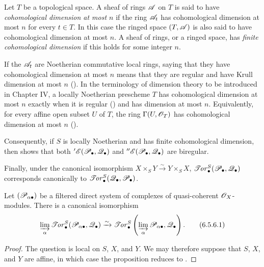\begin{env}[6.5.5]
\label{III.6.5.5}
Let $T$ be a topological space.  A sheaf of rings $\mathscr{A}$ on $T$
is said to have \emph{cohomological dimension at most $n$} if the
ring $\mathscr{A}_t$ has cohomological dimension at most $n$ for every
$t\in T$.  In this case the ringed space $(T,\mathscr{A})$ is also said
to have cohomological dimension at most $n$.  A sheaf of rings, or
a ringed space, has \emph{finite cohomological dimension} if this
holds for some integer $n$.

If the $\mathscr{A}_t$ are Noetherian commutative local rings, saying
that they have cohomological dimension at most $n$ means that
they are regular and have Krull dimension at most $n$
().  In the terminology of dimension theory to
be introduced in Chapter IV, a locally Noetherian prescheme $T$ has
cohomological dimension at most $n$ exactly when it is regular
() and has dimension at most $n$.  Equivalently,
for every affine open subset $U$ of $T$, the ring
$\Gamma(U,\mathscr{O}_T)$ has cohomological dimension at most $n$
().

Consequently, if $S$ is locally Noetherian and has finite
cohomological dimension, then  shows that both
$'\mathscr{E}(\mathscr{P}_\bullet,\mathscr{Q}_\bullet)$ and
$''\mathscr{E}(\mathscr{P}_\bullet,\mathscr{Q}_\bullet)$ are biregular.

Finally, under the canonical isomorphism
$X\times_SY\xrightarrow{\sim}Y\times_SX$,
$\mathscr{T}\!\mathit{or}_\bullet^S(\mathscr{P}_\bullet,\mathscr{Q}_\bullet)$ corresponds
canonically to
$\mathscr{T}\!\mathit{or}_\bullet^S(\mathscr{Q}_\bullet,\mathscr{P}_\bullet)$.
\end{env}

\begin{proposition}[6.5.6]
\label{III.6.5.6}
Let $(\mathscr{P}_{\alpha\bullet})$ be a filtered direct system of
complexes of quasi-coherent $\mathscr{O}_X$-modules.  There is a
canonical isomorphism
\[
  \varinjlim_\alpha
  \mathscr{T}\!\mathit{or}_\bullet^S(\mathscr{P}_{\alpha\bullet},\mathscr{Q}_\bullet)
  \xrightarrow{\sim}
  \mathscr{T}\!\mathit{or}_\bullet^S
  \left(\varinjlim_\alpha\mathscr{P}_{\alpha\bullet},\mathscr{Q}_\bullet\right).
  \tag{6.5.6.1}\label{III.6.5.6.1}
\]
\end{proposition}

\begin{proof}
The question is local on $S$, $X$, and $Y$.  We may therefore
suppose that $S$, $X$, and $Y$ are affine, in which case the
proposition reduces to .
\end{proof}

